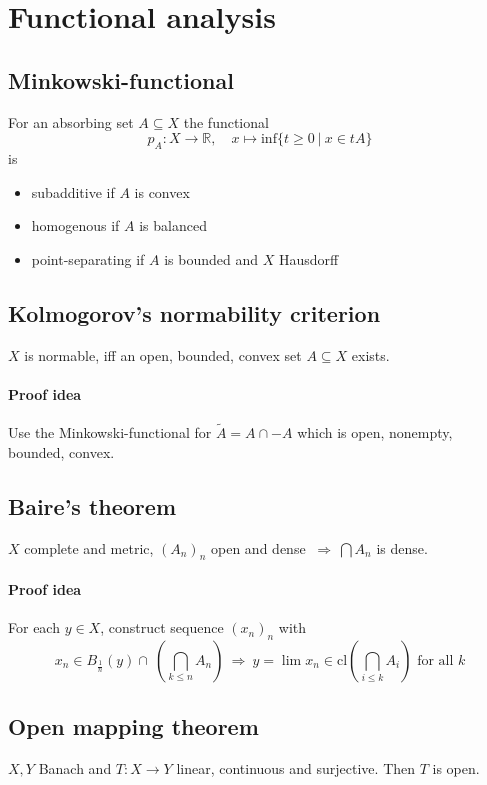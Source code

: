\documentclass{scrartcl}
\newcommand{\R}{\mathbb{R}}
\begin{document}
\section{Functional analysis}

\subsection{Minkowski-functional}
For an absorbing set $A \subseteq X$ the functional
\begin{equation}
    p_A: X \to \R, \quad x \mapsto \mathrm{inf}\{t \geq 0 \ | \ x \in tA \} \nonumber
\end{equation} is
\begin{itemize}
    \item subadditive if $A$ is convex
    \item homogenous if $A$ is balanced
    \item point-separating if $A$ is bounded and $X$ Hausdorff
\end{itemize}

\subsection{Kolmogorov's normability criterion}
$X$ is normable, iff an open, bounded, convex set $A \subseteq X$ exists.
\paragraph{Proof idea} Use the Minkowski-functional for $\tilde{A} = A \cap -A$ which is open, nonempty, bounded, convex.

\subsection{Baire's theorem}
$X$ complete and metric, $\left( A_n \right)_n$ open and dense $ \ \Rightarrow \ \bigcap A_n $ is dense.
\paragraph{Proof idea} For each $y \in X$, construct sequence $(x_n)_n$ with 
\begin{equation}
    x_n \in B_{\frac 1 n}(y) \cap \ \left( \bigcap_{k \leq n} A_n \right) \ \Rightarrow \ y = \lim x_n \in \mathrm{cl}\left( \bigcap_{i \leq k} A_i \right) \text{ for all } k \nonumber
\end{equation}

\subsection{Open mapping theorem}
$X, Y$ Banach and $T: X \to Y$ linear, continuous and surjective. Then $T$ is open.
\end{document}
